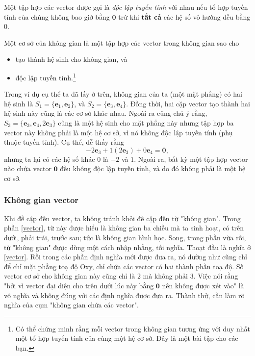 \begin{definition}
    Một tập hợp các vector được gọi là \emph{độc lập tuyến tính} với nhau nếu tổ hợp tuyến tính của chúng không bao giờ bằng \(\mathbf{0}\) trừ khi \textbf{tất cả} các hệ số vô hướng đều bằng \(0\).
\end{definition}
\begin{definition}[Hệ cơ sở]
    Một cơ sở của không gian là một tập hợp các vector trong không gian sao cho 
    \begin{itemize}
        \item tạo thành hệ sinh cho không gian, và
        \item độc lập tuyến tính.\footnote{Có thể chứng minh rằng mỗi vector trong không gian tương ứng với duy nhất một tổ hợp tuyến tính của cùng một hệ cơ sở. Đây là một bài tập cho các bạn.}
    \end{itemize}
\end{definition}
Trong ví dụ cụ thể ta đã lấy ở trên, không gian của ta (một mặt phẳng) có hai hệ sinh là \(S_1 =\{\mathbf{e}_{1}, \mathbf{e}_2\}\), và \(S_2 =\{\mathbf{e}_{3}, \mathbf{e}_{4}\}\). Đồng thời, hai cặp vector tạo thành hai hệ sinh này cũng là các cơ sở khác nhau. Ngoài ra cũng chú ý rằng, \(S_{3}=\{\mathbf{e}_{3}, \mathbf{e}_{4}, 2\mathbf{e}_{3}\}\) cũng là một hệ sinh cho mặt phẳng này nhưng tập hợp ba vector này không phải là một hệ cơ sở, vì nó không độc lập tuyến tính (phụ thuộc tuyến tính). Cụ thể, dễ thấy rằng \[-2\mathbf{e}_{3}+1(2\mathbf{e}_{3})+0\mathbf{e}_{4}=\mathbf{0},\] nhưng ta lại có các hệ số khác \(0\) là \(-2\) và \(1\). Ngoài ra, bất kỳ một tập hợp vector nào chứa vector \(\mathbf{0}\) đều không độc lập tuyến tính, và do đó không phải là một hệ cơ sở.

\subsubsection*{Không gian vector}
Khi đề cập đến vector, ta không tránh khỏi đề cập đến từ "không gian". Trong phần \ref{vector}, từ này được hiểu là không gian ba chiều mà ta sinh hoạt, có trên dưới, phải trái, trước sau; tức là không gian hình học. Song, trong phần vừa rồi, từ "không gian" được dùng một cách nhập nhằng, tối nghĩa. Thoạt đầu là nghĩa ở \ref{vector}. Rồi trong các phần định nghĩa mới được đưa ra, nó dường như cũng chỉ để chỉ mặt phẳng toạ độ Oxy, chỉ chứa các vector có hai thành phần toạ độ. Số vector cơ sở cho không gian này cũng chỉ là \(2\) mà không phải \(3\). Việc nói rằng "bởi vì vector đại diện cho trên dưới lúc này bằng \(\mathbf{0}\) nên không được xét vào" là vô nghĩa và không đúng với các định nghĩa được đưa ra. 
Thành thử, cần làm rõ nghĩa của cụm "không gian chứa các vector".
\vspace{8pt}


